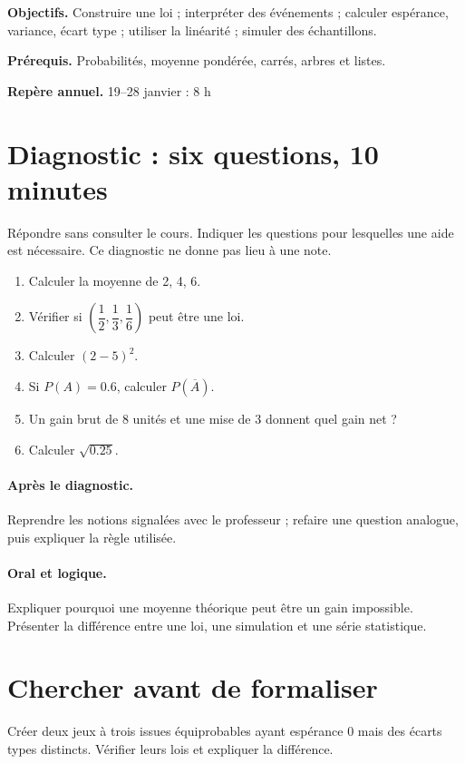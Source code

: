 \label{C08}
\begin{keypoint}
\textbf{Objectifs.} Construire une loi ; interpréter des événements ; calculer espérance, variance, écart type ; utiliser la linéarité ; simuler des échantillons.

\textbf{Prérequis.} Probabilités, moyenne pondérée, carrés, arbres et listes.

\textbf{Repère annuel.} 19–28 janvier : 8 h\end{keypoint}
\section*{Diagnostic : six questions, 10 minutes}\label{C08-D}
Répondre sans consulter le cours. Indiquer les questions pour lesquelles une aide est nécessaire. Ce diagnostic ne donne pas lieu à une note.
\begin{enumerate}
\item Calculer la moyenne de 2, 4, 6.
\item Vérifier si $(\dfrac{1}{2},\dfrac{1}{3},\dfrac{1}{6})$ peut être une loi.
\item Calculer $(2-5)^2$.
\item Si $P(A)=\num{0,6}$, calculer $P(\overline A)$.
\item Un gain brut de 8 unités et une mise de 3 donnent quel gain net ?
\item Calculer $\sqrt{\num{0,25}}$.
\end{enumerate}
\paragraph{Après le diagnostic.} Reprendre les notions signalées avec le professeur ; refaire une question analogue, puis expliquer la règle utilisée.
\paragraph{Oral et logique.} Expliquer pourquoi une moyenne théorique peut être un gain impossible. Présenter la différence entre une loi, une simulation et une série statistique.
\mxnewpage
\section*{Chercher avant de formaliser}\label{C08-RECH}
Créer deux jeux à trois issues équiprobables ayant espérance 0 mais des écarts types distincts. Vérifier leurs lois et expliquer la différence.
